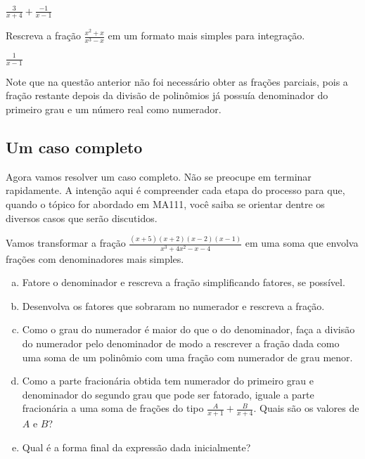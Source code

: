 \documentclass[main_estudante.tex]{subfiles}
\begin{document}
\begin{gabarito}
	\begin{gabaritoQuestao}
		$\frac{3}{x+4}+\frac{-1}{x-1}$
	\end{gabaritoQuestao}
\end{gabarito}


\begin{questao}
Rescreva a fração $\frac{x^2+x}{x^3-x}$ em um formato mais simples para integração.
\end{questao}

\begin{gabarito}
	\begin{gabaritoQuestao}
		$\frac{1}{x-1}$
	\end{gabaritoQuestao}
\end{gabarito}

Note que na questão anterior não foi necessário obter as frações parciais, pois a fração restante depois da divisão de polinômios já possuía denominador do primeiro grau e um número real como numerador.

\subsection*{Um caso completo}

Agora vamos resolver um caso completo. Não se preocupe em terminar rapidamente. A intenção aqui é compreender cada etapa do processo para que, quando o tópico for abordado em MA111, você saiba se orientar dentre os diversos casos que serão discutidos.

\begin{questao}
Vamos transformar a fração $\frac{(x+5)(x+2)(x-2)(x-1)}{x^3+4x^2-x-4}$ em uma soma que envolva frações com denominadores mais simples.
\begin{enumerate}[a)]
\item Fatore o denominador e rescreva a fração simplificando fatores, se possível.
\item Desenvolva os fatores que sobraram no numerador e rescreva a fração.
\item Como o grau do numerador é maior do que o do denominador, faça a divisão do numerador pelo denominador de modo a rescrever a fração dada como uma soma de um polinômio com uma fração com numerador de grau menor.
\item Como a parte fracionária obtida tem numerador do primeiro grau e denominador do segundo grau que pode ser fatorado, iguale a parte fracionária a uma soma de frações do tipo $\frac{A}{x+1}+\frac{B}{x+4}$. Quais são os valores de $A$ e $B$?
\item Qual é a forma final da expressão dada inicialmente?
\end{enumerate}
\end{questao}
\end{document}
